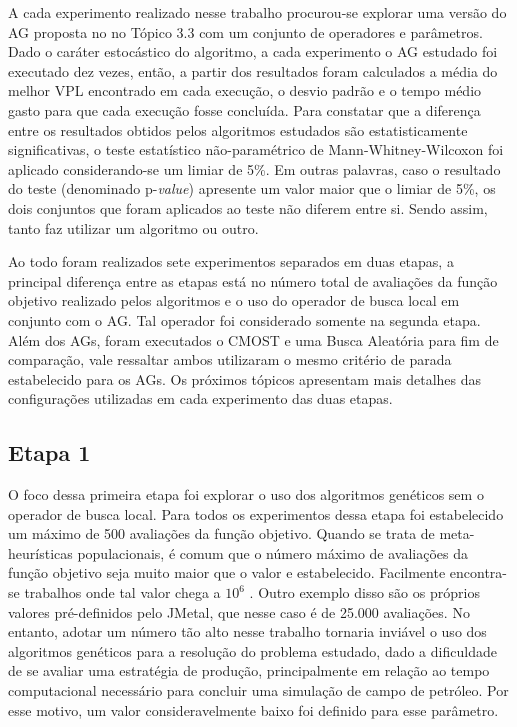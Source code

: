 A cada experimento realizado nesse trabalho procurou-se explorar uma versão do AG proposta no no Tópico 3.3 com um conjunto de operadores e parâmetros. Dado o caráter estocástico do algoritmo, a cada experimento o AG estudado foi executado dez vezes, então, a partir dos resultados foram calculados a média do melhor VPL encontrado em cada execução, o desvio padrão e o tempo médio gasto para que cada execução fosse concluída. Para constatar que a diferença entre os resultados obtidos pelos algoritmos estudados são estatisticamente significativas, o teste estatístico não-paramétrico de Mann-Whitney-Wilcoxon \cite{Corder2014} foi aplicado considerando-se um limiar de 5\%. Em outras palavras, caso o resultado do teste (denominado p-\textit{value}) apresente um valor maior que o limiar de 5\%, os dois conjuntos que foram aplicados ao teste não diferem entre si. Sendo assim, tanto faz utilizar um algoritmo ou outro. 

Ao todo foram realizados sete experimentos separados em duas etapas, a principal diferença entre as etapas está no número total de avaliações da função objetivo realizado pelos algoritmos e o uso do operador de busca local em conjunto com o AG. Tal operador foi considerado somente na segunda etapa. Além dos AGs, foram executados o CMOST e uma Busca Aleatória para fim de comparação, vale ressaltar ambos utilizaram o mesmo critério de parada estabelecido para os AGs. Os próximos tópicos apresentam mais detalhes das configurações utilizadas em cada experimento das duas etapas.

\subsection{Etapa 1}

O foco dessa primeira etapa foi explorar o uso dos algoritmos genéticos sem o operador de busca local. Para todos os experimentos dessa etapa foi estabelecido um máximo de 500 avaliações da função objetivo. Quando se trata de meta-heurísticas populacionais, é comum que o número máximo de avaliações da função objetivo seja muito maior que o valor e estabelecido. Facilmente encontra-se trabalhos onde tal valor chega a $10^6$ \cite{Elsayed2016,Tangherloni2017,Kumar2017,Zamuda2017}. Outro exemplo disso são os próprios valores pré-definidos pelo JMetal, que nesse caso é de 25.000 avaliações. No entanto, adotar um número tão alto nesse trabalho tornaria inviável o uso dos algoritmos genéticos para a resolução do problema estudado, dado a dificuldade de se avaliar uma estratégia de produção, principalmente em relação ao tempo computacional necessário para concluir uma simulação de campo de petróleo. Por esse motivo, um valor consideravelmente baixo foi definido para esse parâmetro. 

